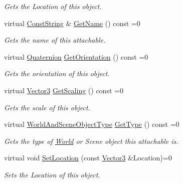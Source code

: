 \begin{DoxyCompactItemize}
\begin{DoxyCompactList}\small\item\em Gets the Location of this object. \item\end{DoxyCompactList}\item 
virtual \hyperlink{namespaceMezzanine_a63cd699ac54b73953f35ec9cfc05e506}{ConstString} \& \hyperlink{classMezzanine_1_1AttachableBase_a04b114eccfbf9092b84dfe24e81548b6}{GetName} () const =0
\begin{DoxyCompactList}\small\item\em Gets the name of this attachable. \item\end{DoxyCompactList}\item 
virtual \hyperlink{classMezzanine_1_1Quaternion}{Quaternion} \hyperlink{classMezzanine_1_1AttachableBase_af18f7d1f20ee332facb314291673a313}{GetOrientation} () const =0
\begin{DoxyCompactList}\small\item\em Gets the orientation of this object. \item\end{DoxyCompactList}\item 
virtual \hyperlink{classMezzanine_1_1Vector3}{Vector3} \hyperlink{classMezzanine_1_1AttachableBase_a8e01242f06e5aabc3d53004325f1eeee}{GetScaling} () const =0
\begin{DoxyCompactList}\small\item\em Gets the scale of this object. \item\end{DoxyCompactList}\item 
virtual \hyperlink{namespaceMezzanine_ae8cd04f706f4998be62f454b7119c718}{WorldAndSceneObjectType} \hyperlink{classMezzanine_1_1AttachableBase_a42bb7c2cab933d28dea86d2ec2934c6a}{GetType} () const =0
\begin{DoxyCompactList}\small\item\em Gets the type of \hyperlink{classMezzanine_1_1World}{World} or Scene object this attachable is. \item\end{DoxyCompactList}\item 
virtual void \hyperlink{classMezzanine_1_1AttachableBase_ab4f0d73a5c313874766bd038a32f1ae2}{SetLocation} (const \hyperlink{classMezzanine_1_1Vector3}{Vector3} \&Location)=0
\begin{DoxyCompactList}\small\item\em Sets the Location of this object. \item\end{DoxyCompactList}\item 

\end{DoxyCompactItemize}
